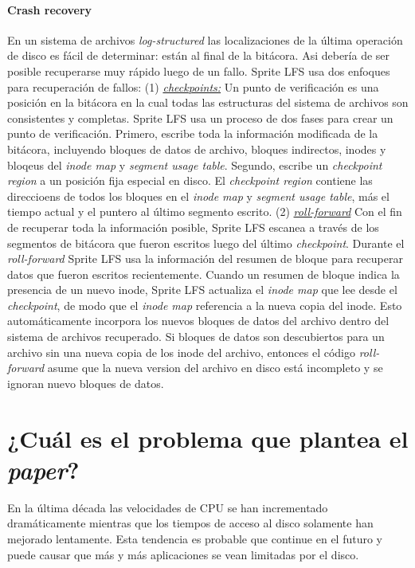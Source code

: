 \paragraph{\textnormal{\textbf{Crash recovery}}}
En un sistema de archivos \emph{log-structured} las localizaciones de la última operación de disco es fácil de determinar: están al final de la bitácora. Asi debería de ser posible recuperarse muy rápido luego de un fallo. Sprite LFS usa dos enfoques para recuperación de fallos: (1) \underline{\emph{checkpoints:}} Un punto de verificación es una posición en la bitácora en la cual todas las estructuras del sistema de archivos son consistentes y completas. Sprite LFS usa un proceso de dos fases para crear un punto de verificación. Primero, escribe toda la información modificada de la bitácora, incluyendo bloques de datos de archivo, bloques indirectos, inodes y bloqeus del \emph{inode map} y \emph{segment usage table}. Segundo, escribe un \emph{checkpoint region} a un posición fija especial en disco. El \emph{checkpoint region} contiene las direccioens de todos los bloques en el \emph{inode map} y \emph{segment usage table}, más el tiempo actual y el puntero al último segmento escrito. (2) \underline{\emph{roll-forward}} Con el fin de recuperar toda la información posible, Sprite LFS escanea a través de los segmentos de bitácora que fueron escritos luego del último \emph{checkpoint}. Durante el \emph{roll-forward} Sprite LFS usa la información del resumen de bloque para recuperar datos que fueron escritos recientemente. Cuando un resumen de bloque indica la presencia de un nuevo inode, Sprite LFS actualiza el \emph{inode map} que lee desde el \emph{checkpoint}, de modo que el \emph{inode map} referencia a la nueva copia del inode. Esto automáticamente incorpora los nuevos bloques de datos del archivo dentro del sistema de archivos recuperado. Si bloques de datos son descubiertos para un archivo sin una nueva copia de los inode del archivo, entonces el código \emph{roll-forward} asume que la nueva version del archivo en disco está incompleto y se ignoran nuevo bloques de datos.

\section{¿Cuál es el problema que plantea el \textit{paper}?}
En la última década las velocidades de CPU se han incrementado dramáticamente mientras que los tiempos de acceso al disco solamente han mejorado lentamente. Esta tendencia es probable que continue en el futuro y puede causar que más y más aplicaciones se vean limitadas por el disco. 

